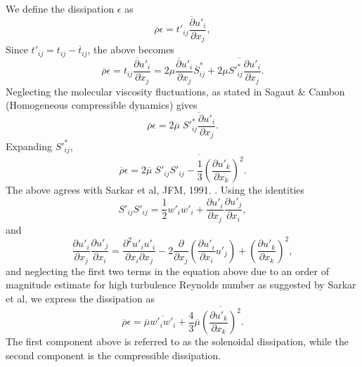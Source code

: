 \documentclass[oneside,a4paper,11pt]{report}
\newcommand{\rhoavg}{\overline{\rho}}
\newcommand{\tavg}{\overline{t}}
\newcommand{\Savg}{\overline{S}}
\newcommand{\tfluc}{t'}
\newcommand{\ufluc}{u'}
\newcommand{\wfluc}{w'}
\newcommand{\Sfluc}{S'}
\begin{document}
We define the dissipation $\epsilon$ as
\begin{equation}
\rhoavg \epsilon = \overline{ \tfluc_{ij} \frac{ \partial \ufluc_i }{\partial x_j } } ,
\end{equation}
Since $\tfluc_{ij} = t_{ij} - \tavg_{ij}$, the above becomes
\begin{equation}
    \rhoavg \epsilon = \overline{ t_{ij} \frac{\partial \ufluc_i}{\partial x_j} } = \overline{ 2 \mu \frac{\partial \ufluc_i}{\partial x_j} } \Savg^*_{ij} + \overline{ 2 \mu \Sfluc^*_{ij} \frac{\partial \ufluc_i}{\partial x_j} }.
\end{equation}
Neglecting the molecular viscosity fluctuations, as stated in Sagaut \& Cambon (Homogeneous compressible dynamics) gives
\begin{equation}
    \rhoavg \epsilon = 2 \overline{ \mu } \; \overline{ \Sfluc^*_{ij} \frac{\partial \ufluc_i}{\partial x_j} }.
\end{equation}
Expanding $\Sfluc^*_{ij}$,
\begin{equation}
    \rhoavg \epsilon = 2 \overline{ \mu } \; \overline{ \Sfluc_{ij} \Sfluc_{ij} - \frac{1}{3} \left ( \frac{ \partial \ufluc_k }{ \partial x_k } \right )^2 }.
\end{equation}
The above agrees with Sarkar et al, JFM, 1991. \cite{Sarkar1991}. Using the identities 
\begin{equation}
\Sfluc_{ij} \Sfluc_{ij} = \frac{1}{2} \wfluc_i \wfluc_i + \frac{ \partial \ufluc_i }{ \partial x_j } \frac{ \partial \ufluc_j }{ \partial x_i}, 
\end{equation}
and
\begin{equation}
\frac{ \partial \ufluc_i }{ \partial x_j } \frac{ \partial \ufluc_j }{ \partial x_i } = \frac{ \partial^2 \ufluc_i \ufluc_i }{ \partial x_i \partial x_j}  -2 \frac{ \partial }{ \partial x_j } \left ( \frac{ \partial \ufluc_i }{ \partial x_i } \ufluc_j \right ) + \left ( \frac{ \partial \ufluc_k }{ \partial x_k } \right )^2 ,
\end{equation}
and neglecting the first two terms in the equation above due to an order of magnitude estimate for high turbulence Reynolds number as suggested by Sarkar et al, we express the dissipation as
\begin{equation}
\rhoavg \epsilon = \overline{ \mu } \overline{ \wfluc_i \wfluc_i } + \frac{4}{3} \overline{ \mu } \overline{ \left ( \frac{ \partial \ufluc_k }{ \partial x_k } \right )^2 }.
\end{equation}
The first component above is referred to as the solenoidal dissipation, while the second component is the compressible dissipation.
\end{document}
